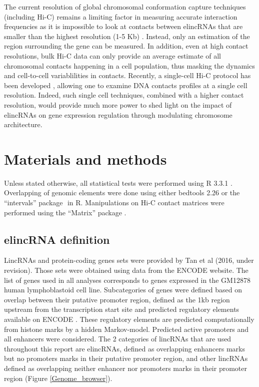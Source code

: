 \documentclass[11pt,a4paper]{report}
\begin{document}
The current resolution of global chromosomal conformation capture techniques (including Hi-C) remains a limiting factor in measuring accurate interaction frequencies as it is impossible to look at contacts between elincRNAs that are smaller than the highest resolution (1-5 Kb) \cite{Rao2014}⁠. Instead, only an estimation of the region surrounding the gene can be measured. In addition, even at high contact resolutions, bulk Hi-C data can only provide an average estimate of all chromosomal contacts happening in a cell population, thus masking the dynamics and cell-to-cell variablilities in contacts. Recently, a single-cell Hi-C protocol has been developed \cite{Nagano2013}⁠, allowing one to examine DNA contacts profiles at a single cell resolution. Indeed, such single cell techniques, combined with a higher contact resolution, would provide much more power to shed light on the impact of elincRNAs on gene expression regulation through modulating chromosome architecture.

\section*{Materials and methods}
Unless stated otherwise, all statistical tests were performed using R 3.3.1 \cite{RCoreTeam2016}⁠. Overlapping of genomic elements were done using either bedtools 2.26 \cite{Quinlan2010}⁠or the “intervals” package \cite{Bourgon2015}⁠ in R. Manipulations on Hi-C contact matrices were performed using the “Matrix” package \cite{Bates2016}⁠.

\subsection*{elincRNA definition}

LincRNAs and protein-coding genes sets were provided by Tan et al (2016, under revision). Those sets were obtained using data from the ENCODE website. The list of genes used in all analyses corresponds to genes expressed in the GM12878 human lymphoblastoid cell line. Subcategories of genes were defined based on overlap between their putative promoter region, defined as the 1kb region upstream from the transcription start site and predicted regulatory elements available on ENCODE \cite{ENCODEProject2012}⁠. These regulatory elements are predicted computationally from histone marks by a hidden Markov-model. Predicted active promoters and all enhancers were considered. The 2 categories of lincRNAs that are used throughout this report are elincRNAs, defined as overlapping enhancers marks but no promoters marks in their putative promoter region, and other lincRNAs defined as overlapping neither enhancer nor promoters marks in their promoter region (Figure \ref{Genome_browser}).
\end{document}
